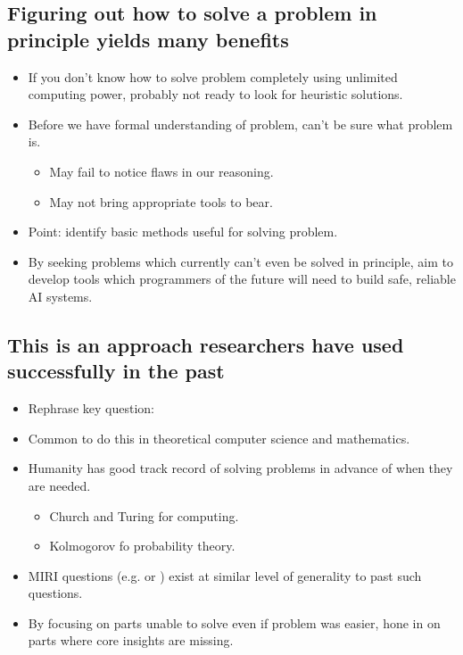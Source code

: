 \subsection{Figuring out how to solve a problem in principle yields many benefits}

\begin{itemize}
    \item If you don't know how to solve problem completely using unlimited computing power, probably not ready to look for heuristic solutions.
    \item Before we have formal understanding of problem, can't be sure what problem is.
    \begin{itemize}
        \item May fail to notice flaws in our reasoning.
        \item May not bring appropriate tools to bear.
    \end{itemize}
    \item Point: identify basic methods useful for solving problem.
    \item By seeking problems which currently can't even be solved in principle, aim to develop tools which programmers of the future will need to build safe, reliable AI systems.
\end{itemize}


\subsection{This is an approach researchers have used successfully in the past}

\begin{itemize}
    \item Rephrase key question: 
    \item Common to do this in theoretical computer science and mathematics.
    \item Humanity has good track record of solving problems in advance of when they are needed.
    \begin{itemize}
        \item Church and Turing for computing.
        \item Kolmogorov fo probability theory.
    \end{itemize}
    \item MIRI questions (e.g.\@ {} or ) exist at similar level of generality to past such questions.
    \item By focusing on parts unable to solve even if problem was easier, hone in on parts where core insights are missing.
\end{itemize}


